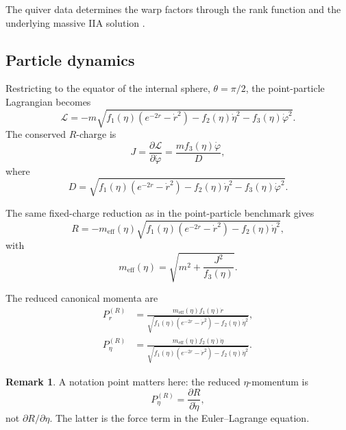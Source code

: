 \documentclass[11pt,a4paper]{article}
\theoremstyle{plain}
\theoremstyle{definition}
\newtheorem{remark}[proposition]{Remark}
\theoremstyle{remark}
\newcommand{\PrR}{P_r^{(R)}}
\newcommand{\PetaR}{P_\eta^{(R)}}
\newcommand{\meff}{m_{\mathrm{eff}}}
\begin{document}
The quiver data determines the warp factors through the rank function and the underlying massive IIA solution \cite{Fatemiabhari:2026rob}.

\subsection{Particle dynamics}

Restricting to the equator of the internal sphere, $\theta=\pi/2$, the point-particle Lagrangian becomes
\begin{equation*}
\mathcal L
=
-m
\sqrt{
f_1(\eta)(e^{-2r}-\dot r^2)
-f_2(\eta)\dot\eta^2
-f_3(\eta)\dot\varphi^2
}.
\end{equation*}
The conserved $R$-charge is
\begin{equation*}
J
=
\frac{\partial\mathcal L}{\partial\dot\varphi}
=
\frac{
m f_3(\eta)\dot\varphi
}{
D
},
\end{equation*}
where
\begin{equation*}
D
=
\sqrt{
f_1(\eta)(e^{-2r}-\dot r^2)
-f_2(\eta)\dot\eta^2
-f_3(\eta)\dot\varphi^2
}.
\end{equation*}

The same fixed-charge reduction as in the point-particle benchmark gives
\begin{equation*}
\boxed{
R
=
-\meff(\eta)
\sqrt{
f_1(\eta)(e^{-2r}-\dot r^2)
-f_2(\eta)\dot\eta^2
},
}
\end{equation*}
with
\begin{equation*}
\boxed{
\meff(\eta)
=
\sqrt{
m^2+\frac{J^2}{f_3(\eta)}
}.
}
\end{equation*}

The reduced canonical momenta are
\begin{align*}
\PrR
&=
\frac{
\meff(\eta)f_1(\eta)\dot r
}{
\sqrt{
f_1(\eta)(e^{-2r}-\dot r^2)
-f_2(\eta)\dot\eta^2
}
},
\\
\PetaR
&=
\frac{
\meff(\eta)f_2(\eta)\dot\eta
}{
\sqrt{
f_1(\eta)(e^{-2r}-\dot r^2)
-f_2(\eta)\dot\eta^2
}
}.
\end{align*}

\begin{remark}
A notation point matters here: the reduced $\eta$-momentum is
\begin{equation*}
P_\eta^{(R)}=\frac{\partial R}{\partial\dot\eta},
\end{equation*}
not $\partial R/\partial\eta$. The latter is the force term in the Euler--Lagrange equation.
\end{remark}
\end{document}
